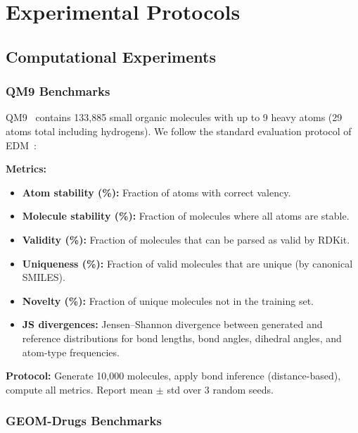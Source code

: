 \documentclass[12pt,a4paper]{article}
\begin{document}
\section{Experimental Protocols}\label{sec:experiments}

\subsection{Computational Experiments}\label{sec:comp_experiments}

\subsubsection{QM9 Benchmarks}

QM9~\cite{ramakrishnan2014qm9} contains 133,885 small organic molecules with up to 9 heavy atoms (29 atoms total including hydrogens). We follow the standard evaluation protocol of EDM~\cite{hoogeboom2022edm}:

\textbf{Metrics:}
\begin{itemize}
    \item \textbf{Atom stability (\%):} Fraction of atoms with correct valency.
    \item \textbf{Molecule stability (\%):} Fraction of molecules where all atoms are stable.
    \item \textbf{Validity (\%):} Fraction of molecules that can be parsed as valid by RDKit.
    \item \textbf{Uniqueness (\%):} Fraction of valid molecules that are unique (by canonical SMILES).
    \item \textbf{Novelty (\%):} Fraction of unique molecules not in the training set.
    \item \textbf{JS divergences:} Jensen--Shannon divergence between generated and reference distributions for bond lengths, bond angles, dihedral angles, and atom-type frequencies.
\end{itemize}

\textbf{Protocol:} Generate 10,000 molecules, apply bond inference (distance-based), compute all metrics. Report mean $\pm$ std over 3 random seeds.

\subsubsection{GEOM-Drugs Benchmarks}
\end{document}
